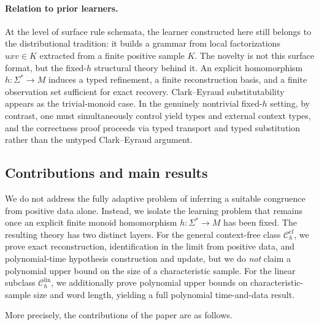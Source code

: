 \documentclass[11pt,a4paper]{article}
\newcommand{\cf}{\mathrm{cf}}
\newcommand{\lin}{\mathrm{lin}}
\newcommand{\Ccf}[1]{\mathcal C_{#1}^{\cf}}
\newcommand{\Clin}[1]{\mathcal C_{#1}^{\lin}}
\begin{document}
\paragraph{Relation to prior learners.}
At the level of surface rule schemata, the learner constructed here still
belongs to the distributional tradition: it builds a grammar from local
factorizations $uxv\in K$ extracted from a finite positive sample $K$.
The novelty is not this surface format, but the fixed-$h$ structural
theory behind it. An explicit homomorphism $h:\Sigma^*\to M$ induces a
typed refinement, a finite reconstruction basis, and a finite observation
set sufficient for exact recovery. Clark--Eyraud substitutability appears
as the trivial-monoid case. In the genuinely nontrivial fixed-$h$ setting,
by contrast, one must simultaneously control yield types and external
context types, and the correctness proof proceeds via typed transport and
typed substitution rather than the untyped Clark--Eyraud argument.


\subsection{Contributions and main results}

We do not address the fully adaptive problem of inferring a suitable
congruence from positive data alone. Instead, we isolate the learning
problem that remains once an explicit finite monoid homomorphism
$h:\Sigma^*\to M$ has been fixed. The resulting theory has two distinct
layers. For the general context-free class $\Ccf{h}$, we prove exact
reconstruction, identification in the limit from positive data, and
polynomial-time hypothesis construction and update, but we do \emph{not}
claim a polynomial upper bound on the size of a characteristic sample.
For the linear subclass $\Clin{h}$, we additionally prove polynomial upper
bounds on characteristic-sample size and word length, yielding a full
polynomial time-and-data result.

More precisely, the contributions of the paper are as follows.
\end{document}
